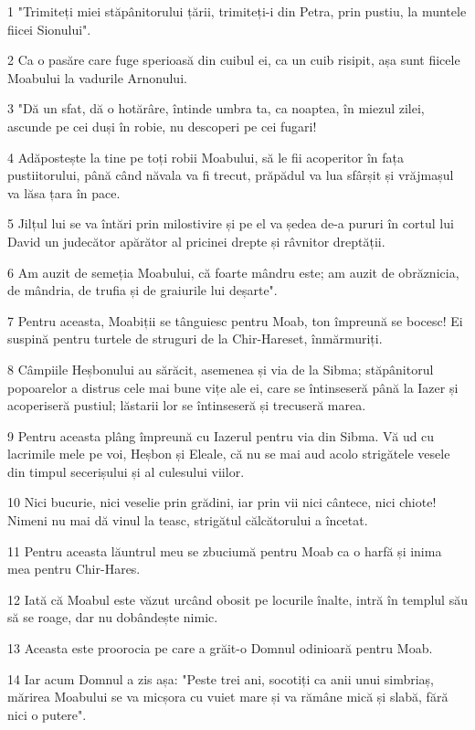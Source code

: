 \par 1 "Trimiteți miei stăpânitorului țării, trimiteți-i din Petra, prin pustiu, la muntele fiicei Sionului".
\par 2 Ca o pasăre care fuge sperioasă din cuibul ei, ca un cuib risipit, așa sunt fiicele Moabului la vadurile Arnonului.
\par 3 "Dă un sfat, dă o hotărâre, întinde umbra ta, ca noaptea, în miezul zilei, ascunde pe cei duși în robie, nu descoperi pe cei fugari!
\par 4 Adăpostește la tine pe toți robii Moabului, să le fii acoperitor în fața pustiitorului, până când năvala va fi trecut, prăpădul va lua sfârșit și vrăjmașul va lăsa țara în pace.
\par 5 Jilțul lui se va întări prin milostivire și pe el va ședea de-a pururi în cortul lui David un judecător apărător al pricinei drepte și râvnitor dreptății.
\par 6 Am auzit de semeția Moabului, că foarte mândru este; am auzit de obrăznicia, de mândria, de trufia și de graiurile lui deșarte".
\par 7 Pentru aceasta, Moabiții se tânguiesc pentru Moab, ton împreună se bocesc! Ei suspină pentru turtele de struguri de la Chir-Hareset, înmărmuriți.
\par 8 Câmpiile Heșbonului au sărăcit, asemenea și via de la Sibma; stăpânitorul popoarelor a distrus cele mai bune vițe ale ei, care se întinseseră până la Iazer și acoperiseră pustiul; lăstarii lor se întinseseră și trecuseră marea.
\par 9 Pentru aceasta plâng împreună cu Iazerul pentru via din Sibma. Vă ud cu lacrimile mele pe voi, Heșbon și Eleale, că nu se mai aud acolo strigătele vesele din timpul secerișului și al culesului viilor.
\par 10 Nici bucurie, nici veselie prin grădini, iar prin vii nici cântece, nici chiote! Nimeni nu mai dă vinul la teasc, strigătul călcătorului a încetat.
\par 11 Pentru aceasta lăuntrul meu se zbuciumă pentru Moab ca o harfă și inima mea pentru Chir-Hares.
\par 12 Iată că Moabul este văzut urcând obosit pe locurile înalte, intră în templul său să se roage, dar nu dobândește nimic.
\par 13 Aceasta este proorocia pe care a grăit-o Domnul odinioară pentru Moab.
\par 14 Iar acum Domnul a zis așa: "Peste trei ani, socotiți ca anii unui simbriaș, mărirea Moabului se va micșora cu vuiet mare și va rămâne mică și slabă, fără nici o putere".


